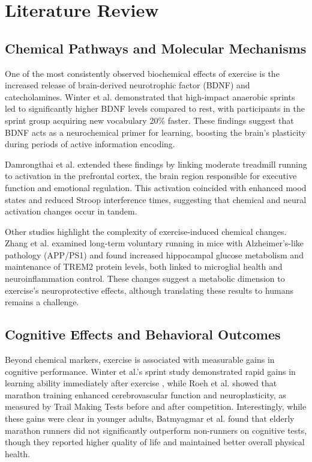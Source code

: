 \documentclass[runningheads]{llncs}
\begin{document}
\section{Literature Review}
\subsection{Chemical Pathways and Molecular Mechanisms}

One of the most consistently observed biochemical effects of exercise is the increased release of brain-derived neurotrophic factor (BDNF) and catecholamines. Winter et al. \cite{winter2007high} demonstrated that high-impact anaerobic sprints led to significantly higher BDNF levels compared to rest, with participants in the sprint group acquiring new vocabulary 20\% faster. These findings suggest that BDNF acts as a neurochemical primer for learning, boosting the brain’s plasticity during periods of active information encoding.

Damrongthai et al. \cite{damrongthai2021benefit} extended these findings by linking moderate treadmill running to activation in the prefrontal cortex, the brain region responsible for executive function and emotional regulation. This activation coincided with enhanced mood states and reduced Stroop interference times, suggesting that chemical and neural activation changes occur in tandem.

Other studies highlight the complexity of exercise-induced chemical changes. Zhang et al. \cite{zhang2022long} examined long-term voluntary running in mice with Alzheimer’s-like pathology (APP/PS1) and found increased hippocampal glucose metabolism and maintenance of TREM2 protein levels, both linked to microglial health and neuroinflammation control. These changes suggest a metabolic dimension to exercise's neuroprotective effects, although translating these results to humans remains a challenge.

\subsection{Cognitive Effects and Behavioral Outcomes}

Beyond chemical markers, exercise is associated with measurable gains in cognitive performance. Winter et al.’s sprint study demonstrated rapid gains in learning ability immediately after exercise \cite{winter2007high}, while Roeh et al. \cite{roeh2021effects} showed that marathon training enhanced cerebrovascular function and neuroplasticity, as measured by Trail Making Tests before and after competition. Interestingly, while these gains were clear in younger adults, Batmyagmar et al. \cite{batmyagmar2019high} found that elderly marathon runners did not significantly outperform non-runners on cognitive tests, though they reported higher quality of life and maintained better overall physical health.
\end{document}
